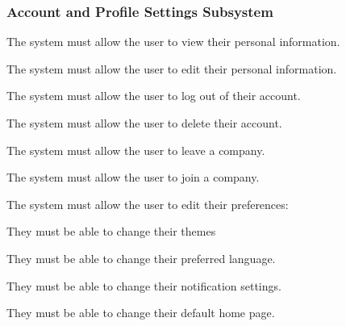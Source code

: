 \documentclass{article}
\begin{document}
	\subsubsection*{Account and Profile Settings Subsystem}	
	\begin{list}{R.}{}
		\item The system must allow the user to view their personal information. 
		\item The system must allow the user to edit their personal information.
		\item The system must allow the user to log out of their account.
		\item The system must allow the user to delete their account.
		\item The system must allow the user to leave a company.
		\item The system must allow the user to join a company.
		\item The system must allow the user to edit their preferences: 
		\begin{list}{R.}{}
			\item They must be able to change their themes
			\item They must be able to change their preferred language.
			\item They must be able to change their notification settings.
			\item They must be able to change their default home page.
		\end{list}
	\end{list}
\end{document}
